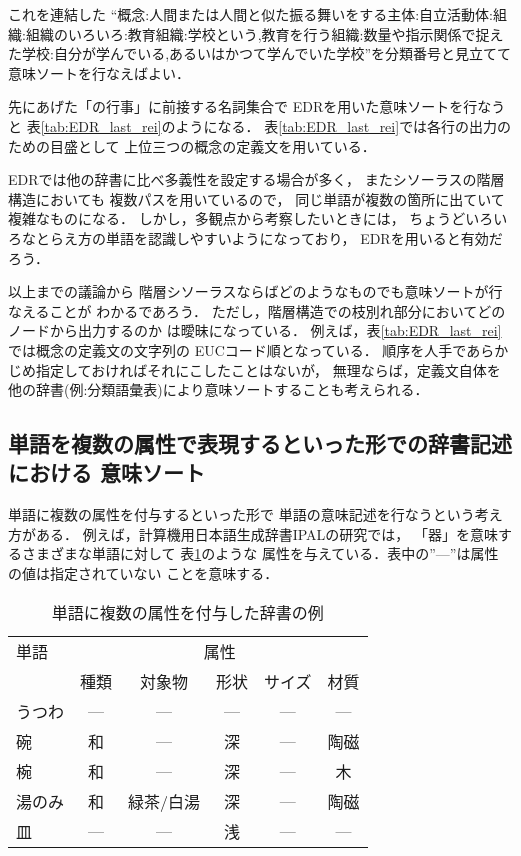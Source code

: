 \noindent
これを連結した
``概念:人間または人間と似た振る舞いをする主体:自立活動体:組織:組織のいろいろ:教育組織:学校という,教育を行う組織:数量や指示関係で捉えた学校:自分が学んでいる,あるいはかつて学んでいた学校''を分類番号と見立てて
意味ソートを行なえばよい．

先にあげた「の行事」に前接する名詞集合で
EDRを用いた意味ソートを行なうと
表\ref{tab:EDR_last_rei}のようになる．
表\ref{tab:EDR_last_rei}では各行の出力のための目盛として
上位三つの概念の定義文を用いている．

EDRでは他の辞書に比べ多義性を設定する場合が多く，
またシソーラスの階層構造においても
複数パスを用いているので，
同じ単語が複数の箇所に出ていて複雑なものになる．
しかし，多観点から考察したいときには，
ちょうどいろいろなとらえ方の単語を認識しやすいようになっており，
EDRを用いると有効だろう．

以上までの議論から
階層シソーラスならばどのようなものでも意味ソートが行なえることが
わかるであろう．
ただし，階層構造での枝別れ部分においてどのノードから出力するのか
は曖昧になっている．
例えば，表\ref{tab:EDR_last_rei}では概念の定義文の文字列の
EUCコード順となっている．
順序を人手であらかじめ指定しておければそれにこしたことはないが，
無理ならば，定義文自体を
他の辞書(例:分類語彙表)により意味ソートすることも考えられる．

\subsection{単語を複数の属性で表現するといった形での辞書記述における
意味ソート}
\label{sec:hukusuu_zokusei}

単語に複数の属性を付与するといった形で
単語の意味記述を行なうという考え方がある．
例えば，計算機用日本語生成辞書IPALの研究\cite{ipalg98}では，
「器」を意味するさまざまな単語に対して
表\ref{tab:ipal_hukusuu_zokusei_rei}のような
属性を与えている．表中の''---''は属性の値は指定されていない
ことを意味する．

\begin{table}[t]
  \caption{単語に複数の属性を付与した辞書の例}
  \label{tab:ipal_hukusuu_zokusei_rei}
  \begin{center}
\small\renewcommand{\arraystretch}{}
\begin{tabular}[c]{|l|ccccc|}\hline
単語    & \multicolumn{5}{c|}{属性}\\\cline{2-6}
        & \multicolumn{1}{c}{種類}& \multicolumn{1}{c}{対象物} & \multicolumn{1}{c}{形状} & \multicolumn{1}{c}{サイズ} & \multicolumn{1}{c|}{材質}\\\hline
うつわ  & --- & --- & --- & --- & ---\\
碗      & 和  & --- & 深  & --- & 陶磁\\
椀      & 和  & --- & 深  & --- & 木  \\
湯のみ  & 和  & 緑茶/白湯 & 深  & --- & 陶磁 \\
皿      & --- & --- & 浅  & --- & ---\\\hline
\end{tabular}
\end{center}
\end{table}

